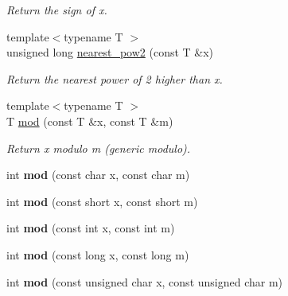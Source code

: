 \begin{DoxyCompactItemize}
\begin{DoxyCompactList}\small\item\em Return the sign of {\ttfamily x}. \end{DoxyCompactList}\item 
\hypertarget{namespacecimg__library_1_1cimg_aeb5c663482bdc065c868ed0b0a528627}{{\footnotesize template$<$typename T $>$ }\\unsigned long \hyperlink{namespacecimg__library_1_1cimg_aeb5c663482bdc065c868ed0b0a528627}{nearest\-\_\-pow2} (const T \&x)}\label{namespacecimg__library_1_1cimg_aeb5c663482bdc065c868ed0b0a528627}

\begin{DoxyCompactList}\small\item\em Return the nearest power of 2 higher than {\ttfamily x}. \end{DoxyCompactList}\item 
{\footnotesize template$<$typename T $>$ }\\T \hyperlink{namespacecimg__library_1_1cimg_af6508b733d0d7887da1cf583b703f3a1}{mod} (const T \&x, const T \&m)
\begin{DoxyCompactList}\small\item\em Return {\ttfamily x} modulo {\ttfamily m} (generic modulo). \end{DoxyCompactList}\item 
\hypertarget{namespacecimg__library_1_1cimg_ac83e707bfa295ccdba0bc29e01491ab0}{int {\bfseries mod} (const char x, const char m)}\label{namespacecimg__library_1_1cimg_ac83e707bfa295ccdba0bc29e01491ab0}

\item 
\hypertarget{namespacecimg__library_1_1cimg_aced6be30ab2fddcdc730548f14cb21a7}{int {\bfseries mod} (const short x, const short m)}\label{namespacecimg__library_1_1cimg_aced6be30ab2fddcdc730548f14cb21a7}

\item 
\hypertarget{namespacecimg__library_1_1cimg_a0462a16e4eb0938329844fb5dc819ca4}{int {\bfseries mod} (const int x, const int m)}\label{namespacecimg__library_1_1cimg_a0462a16e4eb0938329844fb5dc819ca4}

\item 
\hypertarget{namespacecimg__library_1_1cimg_a1bd56f2d6e779d07c6eae1ad180efa13}{int {\bfseries mod} (const long x, const long m)}\label{namespacecimg__library_1_1cimg_a1bd56f2d6e779d07c6eae1ad180efa13}

\item 
\hypertarget{namespacecimg__library_1_1cimg_a3ae36fb931ea9fc7bfd6c2628cc87adf}{int {\bfseries mod} (const unsigned char x, const unsigned char m)}\label{namespacecimg__library_1_1cimg_a3ae36fb931ea9fc7bfd6c2628cc87adf}


\end{DoxyCompactItemize}
